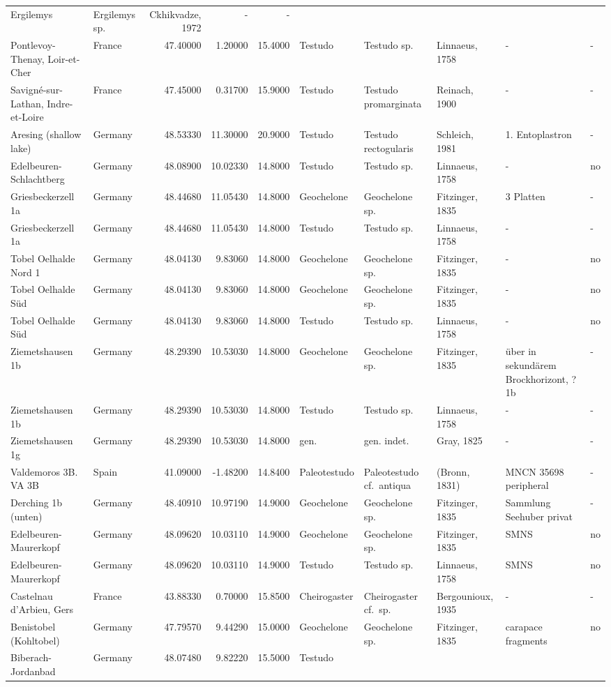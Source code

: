 \begin{landscape}
{\begin{longtable}[]{@{}llrrrlllll@{}}
Ergilemys & Ergilemys sp. & Ckhikvadze, 1972 & - & -\tabularnewline
Pontlevoy-Thenay, Loir-et-Cher & France & 47.40000 & 1.20000 & 15.4000 &
Testudo & Testudo sp. & Linnaeus, 1758 & - & -\tabularnewline
Savigné-sur-Lathan, Indre-et-Loire & France & 47.45000 & 0.31700 &
15.9000 & Testudo & Testudo promarginata & Reinach, 1900 & - &
-\tabularnewline
Aresing (shallow lake) & Germany & 48.53330 & 11.30000 & 20.9000 &
Testudo & Testudo rectogularis & Schleich, 1981 & 1. Entoplastron &
-\tabularnewline
Edelbeuren-Schlachtberg & Germany & 48.08900 & 10.02330 & 14.8000 &
Testudo & Testudo sp. & Linnaeus, 1758 & - & no\tabularnewline
Griesbeckerzell 1a & Germany & 48.44680 & 11.05430 & 14.8000 &
Geochelone & Geochelone sp. & Fitzinger, 1835 & 3 Platten &
-\tabularnewline
Griesbeckerzell 1a & Germany & 48.44680 & 11.05430 & 14.8000 & Testudo &
Testudo sp. & Linnaeus, 1758 & - & -\tabularnewline
Tobel Oelhalde Nord 1 & Germany & 48.04130 & 9.83060 & 14.8000 &
Geochelone & Geochelone sp. & Fitzinger, 1835 & - & no\tabularnewline
Tobel Oelhalde Süd & Germany & 48.04130 & 9.83060 & 14.8000 & Geochelone
& Geochelone sp. & Fitzinger, 1835 & - & no\tabularnewline
Tobel Oelhalde Süd & Germany & 48.04130 & 9.83060 & 14.8000 & Testudo &
Testudo sp. & Linnaeus, 1758 & - & no\tabularnewline
Ziemetshausen 1b & Germany & 48.29390 & 10.53030 & 14.8000 & Geochelone
& Geochelone sp. & Fitzinger, 1835 & über in sekundärem Brockhorizont,
?1b & -\tabularnewline
Ziemetshausen 1b & Germany & 48.29390 & 10.53030 & 14.8000 & Testudo &
Testudo sp. & Linnaeus, 1758 & - & -\tabularnewline
Ziemetshausen 1g & Germany & 48.29390 & 10.53030 & 14.8000 & gen. & gen.
indet. & Gray, 1825 & - & -\tabularnewline
Valdemoros 3B. VA 3B & Spain & 41.09000 & -1.48200 & 14.8400 &
Paleotestudo & Paleotestudo cf.~antiqua & (Bronn, 1831) & MNCN 35698
peripheral & -\tabularnewline
Derching 1b (unten) & Germany & 48.40910 & 10.97190 & 14.9000 &
Geochelone & Geochelone sp. & Fitzinger, 1835 & Sammlung Seehuber privat
& -\tabularnewline
Edelbeuren-Maurerkopf & Germany & 48.09620 & 10.03110 & 14.9000 &
Geochelone & Geochelone sp. & Fitzinger, 1835 & SMNS & no\tabularnewline
Edelbeuren-Maurerkopf & Germany & 48.09620 & 10.03110 & 14.9000 &
Testudo & Testudo sp. & Linnaeus, 1758 & SMNS & no\tabularnewline
Castelnau d'Arbieu, Gers & France & 43.88330 & 0.70000 & 15.8500 &
Cheirogaster & Cheirogaster cf.~sp. & Bergounioux, 1935 & - &
-\tabularnewline
Benistobel (Kohltobel) & Germany & 47.79570 & 9.44290 & 15.0000 &
Geochelone & Geochelone sp. & Fitzinger, 1835 & carapace fragments &
no\tabularnewline
Biberach-Jordanbad & Germany & 48.07480 & 9.82220 & 15.5000 & Testudo &

\end{longtable}}
\end{landscape}
